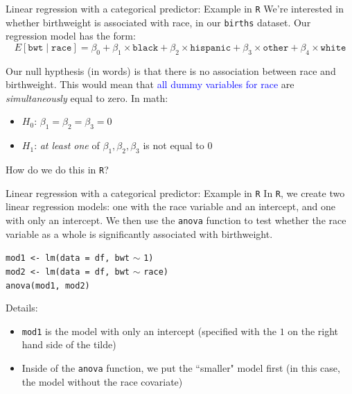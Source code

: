 \documentclass[10pt,t]{beamer}
\begin{document}
\begin{frame}{Linear regression with a categorical predictor: Example in \texttt{R}}
We're interested in whether birthweight is associated with race, in our \texttt{births} dataset. Our regression model has the form:
$$
E[\texttt{bwt} \mid \texttt{race}] = \beta_0 + \beta_1 \times \texttt{black} + \beta_2 \times \texttt{hispanic} + \beta_3 \times \texttt{other} + \beta_4 \times \texttt{white}
$$ \pause

Our null hypthesis (in words) is that there is no association between race and birthweight. This would mean that \textcolor{blue}{all dummy variables for race} are \textit{simultaneously} equal to zero. \pause In math:

\vspace{0.3cm}

\begin{itemize}
	\item $H_0$: $\beta_1 = \beta_2 = \beta_3 = 0$
	\item $H_1$: \textit{at least one} of $\beta_1, \beta_2, \beta_3$ is not equal to $0$
\end{itemize} \pause

\vspace{0.3cm}

How do we do this in \texttt{R}?

\end{frame}

\begin{frame}{Linear regression with a categorical predictor: Example in \texttt{R}}
In \texttt{R}, we create two linear regression models: one with the race variable and an intercept, and one with only an intercept. We then use the \texttt{anova} function to test whether the race variable as a whole is significantly associated with birthweight.

\vspace{0.3cm}

\texttt{mod1 <- lm(data = df, bwt} $\sim$ \texttt{1) \\
	mod2 <- lm(data = df, bwt} $\sim$ \texttt{race) \\
	anova(mod1, mod2)} \pause

\vspace{0.3cm}

Details:
\begin{itemize}
	\item \texttt{mod1} is the model with only an intercept (specified with the $1$ on the right hand side of the tilde)
	\item Inside of the \texttt{anova} function, we put the ``smaller" model first (in this case, the model without the race covariate)
\end{itemize}
\end{frame}
\end{document}
